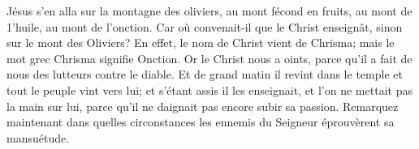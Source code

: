 Jésus s’en alla sur la montagne des oliviers,
	au mont fécond en fruits, au mont de 1’huile, au mont de l’onction.
Car où convenait-il que le Christ enseignât, sinon sur le mont des Oliviers?
En effet, le nom de Christ vient de Chrisma;
	mais le mot grec Chrisma signifie Onction.
Or le Christ nous a oints,
	parce qu’il a fait de nous des lutteurs contre le diable.
Et de grand matin il revint dans le temple et tout le peuple vint vers lui;
	et s’étant assis il les enseignait, et l’on ne mettait pas la main sur lui,
	parce qu’il ne daignait pas encore subir sa passion.
Remarquez maintenant dans quelles circonstances
	les ennemis du Seigneur éprouvèrent sa mansuétude.
